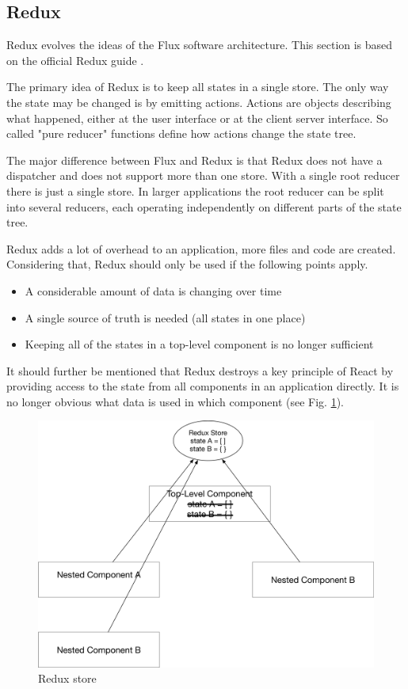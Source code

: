 \subsection{Redux}

Redux evolves the ideas of the Flux software architecture.
This section is based on the official Redux guide \cite{Redux}.

The primary idea of Redux is to keep all states in a single store.
The only way the state may be changed is by emitting actions.
Actions are objects describing what happened, either at the user interface or at 
the client server interface. So called "pure reducer" functions
define how actions change the state tree.

The major difference between Flux and Redux is that Redux does not have 
a dispatcher and does not support more than one store. With a single root reducer there is just a single store.
In larger applications the root reducer can be split into several reducers,
each operating independently on different parts of the state tree.
 
Redux adds a lot of overhead to an application, more files and code are created. 
Considering that, Redux should only be used if the following points apply.

\begin{itemize}
\item A considerable amount of data is changing over time
\item A single source of truth is needed (all states in one place)
\item Keeping all of the states in a top-level component is no longer sufficient
\end{itemize}

It should further be mentioned that Redux destroys a key principle of React by 
providing access to the state from all components in an application directly. 
It is no longer obvious what data is used in which component (see Fig. \ref{fig:Redux}).
\begin{figure}[H]
	\centering
	\includegraphics[width=0.8\linewidth]{bilder/grundlagen/reduxStore.png}
	\caption{Redux store}
	\label{fig:Redux}
\end{figure}

